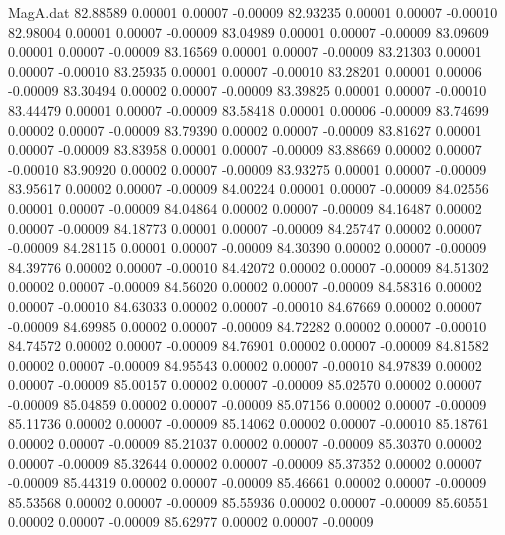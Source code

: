 \begin{filecontents}{MagA.dat}
  82.88589    0.00001    0.00007   -0.00009
  82.93235    0.00001    0.00007   -0.00010
  82.98004    0.00001    0.00007   -0.00009
  83.04989    0.00001    0.00007   -0.00009
  83.09609    0.00001    0.00007   -0.00009
  83.16569    0.00001    0.00007   -0.00009
  83.21303    0.00001    0.00007   -0.00010
  83.25935    0.00001    0.00007   -0.00010
  83.28201    0.00001    0.00006   -0.00009
  83.30494    0.00002    0.00007   -0.00009
  83.39825    0.00001    0.00007   -0.00010
  83.44479    0.00001    0.00007   -0.00009
  83.58418    0.00001    0.00006   -0.00009
  83.74699    0.00002    0.00007   -0.00009
  83.79390    0.00002    0.00007   -0.00009
  83.81627    0.00001    0.00007   -0.00009
  83.83958    0.00001    0.00007   -0.00009
  83.88669    0.00002    0.00007   -0.00010
  83.90920    0.00002    0.00007   -0.00009
  83.93275    0.00001    0.00007   -0.00009
  83.95617    0.00002    0.00007   -0.00009
  84.00224    0.00001    0.00007   -0.00009
  84.02556    0.00001    0.00007   -0.00009
  84.04864    0.00002    0.00007   -0.00009
  84.16487    0.00002    0.00007   -0.00009
  84.18773    0.00001    0.00007   -0.00009
  84.25747    0.00002    0.00007   -0.00009
  84.28115    0.00001    0.00007   -0.00009
  84.30390    0.00002    0.00007   -0.00009
  84.39776    0.00002    0.00007   -0.00010
  84.42072    0.00002    0.00007   -0.00009
  84.51302    0.00002    0.00007   -0.00009
  84.56020    0.00002    0.00007   -0.00009
  84.58316    0.00002    0.00007   -0.00010
  84.63033    0.00002    0.00007   -0.00010
  84.67669    0.00002    0.00007   -0.00009
  84.69985    0.00002    0.00007   -0.00009
  84.72282    0.00002    0.00007   -0.00010
  84.74572    0.00002    0.00007   -0.00009
  84.76901    0.00002    0.00007   -0.00009
  84.81582    0.00002    0.00007   -0.00009
  84.95543    0.00002    0.00007   -0.00010
  84.97839    0.00002    0.00007   -0.00009
  85.00157    0.00002    0.00007   -0.00009
  85.02570    0.00002    0.00007   -0.00009
  85.04859    0.00002    0.00007   -0.00009
  85.07156    0.00002    0.00007   -0.00009
  85.11736    0.00002    0.00007   -0.00009
  85.14062    0.00002    0.00007   -0.00010
  85.18761    0.00002    0.00007   -0.00009
  85.21037    0.00002    0.00007   -0.00009
  85.30370    0.00002    0.00007   -0.00009
  85.32644    0.00002    0.00007   -0.00009
  85.37352    0.00002    0.00007   -0.00009
  85.44319    0.00002    0.00007   -0.00009
  85.46661    0.00002    0.00007   -0.00009
  85.53568    0.00002    0.00007   -0.00009
  85.55936    0.00002    0.00007   -0.00009
  85.60551    0.00002    0.00007   -0.00009
  85.62977    0.00002    0.00007   -0.00009

\end{filecontents}
